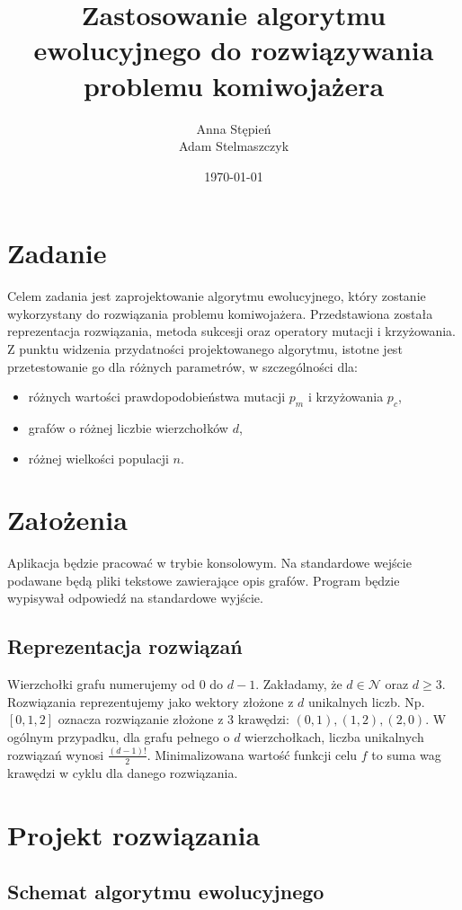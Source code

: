 \documentclass[12pt, a4paper]{article}
\title{\textbf{Zastosowanie algorytmu ewolucyjnego do rozwiązywania problemu komiwojażera}}
\author{Anna Stępień \\ Adam Stelmaszczyk}
\date{\today}
\begin{document}
\maketitle

\section{Zadanie}
Celem zadania jest zaprojektowanie algorytmu ewolucyjnego, który zostanie wykorzystany do rozwiązania problemu komiwojażera.
Przedstawiona została reprezentacja rozwiązania, metoda sukcesji oraz operatory mutacji i krzyżowania. 
Z punktu widzenia przydatności projektowanego algorytmu, istotne jest przetestowanie go dla różnych parametrów, w szczególności dla:
\begin{itemize}
	\item różnych wartości prawdopodobieństwa mutacji $p_m$ i krzyżowania $p_c$,
	\item grafów o różnej liczbie wierzchołków $d$,
	\item różnej wielkości populacji $n$.
\end{itemize}

\section{Założenia}
Aplikacja będzie pracować w trybie konsolowym. Na standardowe wejście podawane będą pliki tekstowe zawierające opis grafów.
Program będzie wypisywał odpowiedź na standardowe wyjście.

\subsection{Reprezentacja rozwiązań}

Wierzchołki grafu numerujemy od 0 do $d - 1$. Zakładamy, że $d \in \mathcal{N}$ oraz $d \geq 3$. 
Rozwiązania reprezentujemy jako wektory złożone z $d$ unikalnych liczb. 
Np. $[0,1,2]$ oznacza rozwiązanie złożone z 3 krawędzi: $(0,1), (1,2), (2,0)$. 
W ogólnym przypadku, dla grafu pełnego o $d$ wierzchołkach, liczba unikalnych rozwiązań wynosi $\frac{(d-1)!}{2}$. 
Minimalizowana wartość funkcji celu $f$ to suma wag krawędzi w cyklu dla danego rozwiązania.

\section{Projekt rozwiązania}

\subsection{Schemat algorytmu ewolucyjnego}
\end{document}
